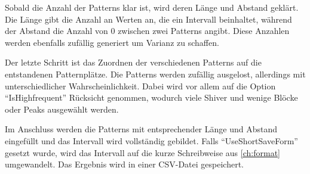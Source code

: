 Sobald die Anzahl der Patterns klar ist, wird deren Länge und Abstand geklärt. Die Länge gibt die Anzahl an Werten an, die ein Intervall beinhaltet, während der Abstand die Anzahl von 0 zwischen zwei Patterns angibt. Diese Anzahlen werden ebenfalls zufällig generiert um Varianz zu schaffen.

Der letzte Schritt ist das Zuordnen der verschiedenen Patterns auf die entstandenen Patternplätze. Die Patterns werden zufällig ausgelost, allerdings mit unterschiedlicher Wahrscheinlichkeit. Dabei wird vor allem auf die Option \enquote{IsHighfrequent} Rücksicht genommen, wodurch viele Shiver und wenige Blöcke oder Peaks ausgewählt werden. 

Im Anschluss werden die Patterns mit entsprechender Länge und Abstand eingefüllt und das Intervall wird vollständig gebildet. Falls \enquote{UseShortSaveForm} gesetzt wurde, wird das Intervall auf die kurze Schreibweise aus \autoref{ch:format} umgewandelt. Das Ergebnis wird in einer CSV-Datei gespeichert.